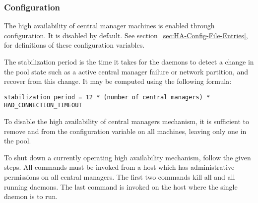 

\subsubsection{\label{sec:HA-configuration} Configuration} 

The high availability of central manager machines is
enabled through configuration.
It is disabled by default.
See
section~\ref{sec:HA-Config-File-Entries},
for definitions of these configuration variables.

The stabilization period is the time it takes for the 
 daemons
to detect a change in the pool state such as
a active central manager failure
or network partition, and recover from this change.
It may be computed using the following formula:
\footnotesize
\begin{verbatim}
stabilization period = 12 * (number of central managers) * HAD_CONNECTION_TIMEOUT
\end{verbatim}
\normalsize


To disable the high availability of central managers mechanism,
it is sufficient to remove
 and  from the
 configuration variable on all machines,
leaving only one  in the pool. 

To shut down a currently operating high availability mechanism,
follow the given steps.
All commands must be invoked
from a host which has administrative permissions
on all central managers.
The first two commands kill all 
and all running  daemons.
The last command is invoked on the host where the
single  daemon is to run.

